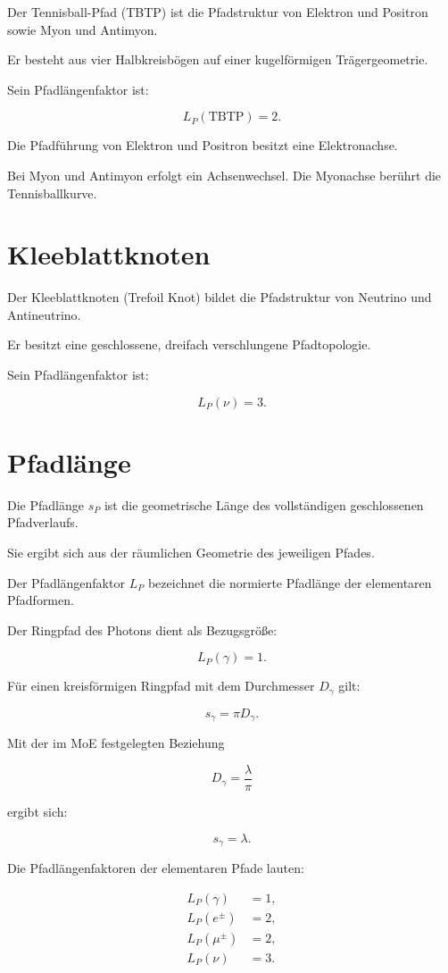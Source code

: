 \documentclass[11pt,a4paper]{article}
\begin{document}
Der Tennisball-Pfad (TBTP)
ist die Pfadstruktur von
Elektron und Positron sowie
Myon und Antimyon.

Er besteht aus vier
Halbkreisbögen auf einer
kugelförmigen Trägergeometrie.

Sein Pfadlängenfaktor ist:

\[
L_P(\mathrm{TBTP})=2.
\]

Die Pfadführung von Elektron
und Positron besitzt eine
Elektronachse.

Bei Myon und Antimyon
erfolgt ein Achsenwechsel.
Die Myonachse berührt die
Tennisballkurve.

\section*{Kleeblattknoten}

Der Kleeblattknoten
(Trefoil Knot) bildet die
Pfadstruktur von Neutrino
und Antineutrino.

Er besitzt eine geschlossene,
dreifach verschlungene
Pfadtopologie.

Sein Pfadlängenfaktor ist:

\[
L_P(\nu)=3.
\]

\section*{Pfadlänge}

Die Pfadlänge $s_P$ ist die
geometrische Länge des
vollständigen geschlossenen
Pfadverlaufs.

Sie ergibt sich aus der
räumlichen Geometrie
des jeweiligen Pfades.

Der Pfadlängenfaktor $L_P$
bezeichnet die normierte
Pfadlänge der elementaren
Pfadformen.

Der Ringpfad des Photons
dient als Bezugsgröße:

\[
L_P(\gamma)=1.
\]

Für einen kreisförmigen
Ringpfad mit dem Durchmesser
$D_\gamma$ gilt:

\[
s_\gamma=\pi D_\gamma.
\]

Mit der im MoE festgelegten
Beziehung

\[
D_\gamma=\frac{\lambda}{\pi}
\]

ergibt sich:

\[
s_\gamma=\lambda.
\]

Die Pfadlängenfaktoren
der elementaren Pfade
lauten:

\[
\begin{aligned}
L_P(\gamma) &= 1,\\
L_P(e^\pm) &= 2,\\
L_P(\mu^\pm) &= 2,\\
L_P(\nu) &= 3.
\end{aligned}
\]
\end{document}
